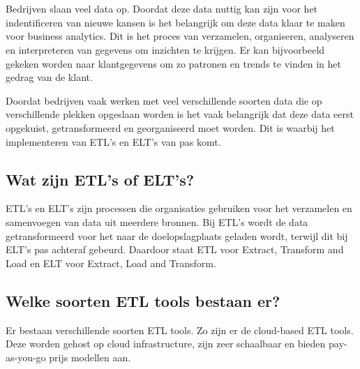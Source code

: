 \chapter{}%
\label{ch:stand-van-zaken}



Bedrijven slaan veel data op. Doordat deze data nuttig kan zijn voor het indentificeren van nieuwe kansen is het belangrijk om deze data klaar te maken voor business analytics. Dit is het proces van verzamelen, organiseren, analyseren en interpreteren van gegevens om inzichten te krijgen. Er kan bijvoorbeeld gekeken worden naar klantgegevens om zo patronen en trends te vinden in het gedrag van de klant.~\autocite{PratibhaKumari2023}

Doordat bedrijven vaak werken met veel verschillende soorten data die op verschillende plekken opgeslaan worden is het vaak belangrijk dat deze data eerst opgekuist, getransformeerd en georganiseerd moet worden. Dit is waarbij het implementeren van ETL's en ELT's van pas komt.~\autocite{Inmon2023}

\section{Wat zijn ETL's of ELT's?}

ETL's en ELT's zijn processen die organisaties gebruiken voor het verzamelen en samenvoegen van data uit meerdere bronnen. Bij ETL's wordt de data getransformeerd voor het naar de doelopslagplaats geladen wordt, terwijl dit bij ELT's pas achteraf gebeurd. Daardoor staat ETL voor Extract, Transform and Load en ELT voor Extract, Load and Transform.~\autocite{Bartley2023}

\section{Welke soorten ETL tools bestaan er?}

Er bestaan verschillende soorten ETL tools. Zo zijn er de cloud-based ETL tools. Deze worden gehost op cloud infrastructure, zijn zeer schaalbaar en bieden pay-as-you-go prijs modellen aan.~\autocite{Ethan2024}

